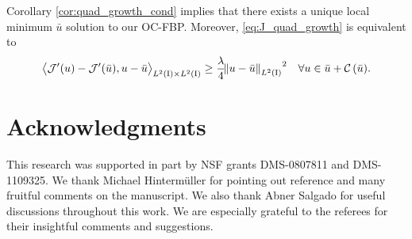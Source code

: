 \documentclass[final]{siamltex}
\begin{document}
Corollary \ref{cor:quad_growth_cond} implies that there exists a unique local minimum ${\bar{u}}$ solution to our OC-FBP. 
Moreover, \eqref{eq:J_quad_growth} is equivalent to 
\begin{align}  \label{eq:gradJ_quad_growth}
	{{\mathop{{\left\langle {{{\mathcal{J}}'(u) - {\mathcal{J}}'({\bar{u}}), u-{\bar{u}}}} \right\rangle}}}_{{{L^2\del{{{\text{\rm I}}}}}}\times{{L^2\del{{{\text{\rm I}}}}}}}} \ge \frac{\lambda}{4} {\norm{{u - {\bar{u}}}}_{{L^2\del{{{\text{\rm I}}}}}}}^2
	\quad \forall u \in {\bar{u}} + {{\mathcal C\del{{\bar{u}}}}} . 
\end{align}

\section*{Acknowledgments}
This research was supported in part by NSF grants DMS-0807811 and DMS-1109325. We 
thank Michael Hinterm\"uller for pointing out reference \cite{JZowe_SKurcyusz_1979a} and
many fruitful comments on the manuscript.  
We also thank Abner Salgado for useful discussions throughout this work. 
We are especially grateful to the referees for their insightful
comments and suggestions.

{\small
  
  
}
\end{document}
